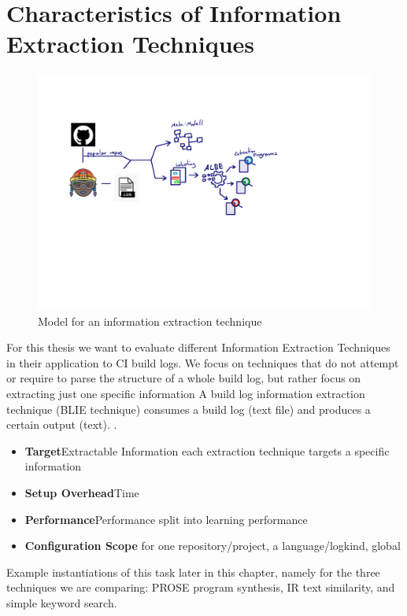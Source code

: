 \documentclass[\myrootdir/main.tex]{subfiles}
\begin{document}
\section{Characteristics of Information Extraction Techniques}
\begin{figure}[h]
	\centering
	\includegraphics[page=3, width=\textwidth, trim={0.5cm 0.5cm 0.5cm 0.5cm}, clip]{img/flow-of-research.pdf}
	\caption{Model for an information extraction technique}
	\label{fig:model-ie-technique}
\end{figure}
For this thesis we want to evaluate different Information Extraction Techniques in their application to CI build logs. We focus on techniques that do not attempt or require to parse the structure of a whole build log, but rather focus on extracting just one specific information
A build log information extraction technique (BLIE technique) consumes a build log (text file) and produces a certain output (text). .
\begin{itemize}
	\item \textbf{Target}{Extractable Information} each extraction technique  targets a specific information
	\item \textbf{Setup Overhead}{Time}
	\item \textbf{Performance}{Performance} split into learning performance
	\item \textbf{Configuration Scope} for one repository/project, a language/logkind, global
\end{itemize}

Example instantiations of this task later in this chapter, namely for the three techniques we are comparing: PROSE program synthesis, IR text similarity, and simple keyword search. 
\end{document}

